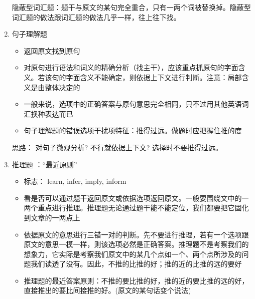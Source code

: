 \documentclass[11pt,twoside,openany,x11names,svgnames]{memoir}
\begin{document}
\begin{enumerate}
隐蔽型词汇题：题干与原文的某句完全重合，只有一两个词被替换掉。隐蔽型词汇题的做法跟词汇题的做法几乎一样，往上往下找。
\item 句子理解题
\begin{itemize}
  \item 返回原文找到原句
  \item 对原句进行语法和词义的精确分析（找主干），应该重点抓原句的字面含义。若该句的字面含义不能确定，则依据上下文进行判断。注意：局部含义是由整体决定的
  \item 一般来说，选项中的正确答案与原句意思完全相同，只不过用其他英语词汇换种表达而已
  \item 句子理解题的错误选项干扰项特征：推得过远。做题时应把握住推的度
\end{itemize}
思路： 对句子微观分析? 不行就依据上下文? 选择时不要推得过远。
\item 推理题 ：“最近原则”
\begin{itemize}
  \item 标志： learn, infer, imply, inform
  \item 看是否可以通过题干返回原文或依据选项返回原文。一般要围绕文中的一两个重点进行推理。推理题无论通过题干能不能定位，我们都要把它固化到文章的一两点上
  \item 依据原文的意思进行三错一对的判断。先不要进行推理，若有一个选项跟原文的意思一模一样，则该选项必然是正确答案。推理题不是考察我们的想象力，它实际是考察我们原文中的某几个点如一个、两个点所涉及的问题我们读透了没有。因此，不推的比推的好；推的近的比推的远的要好
  \item 推理题的最近答案原则：不推的要比推的好，推的近的要比推的远的好，直接推出的要比间接推的好。(原文的某句话变个说法)
\end{itemize}


\end{enumerate}
\end{document}
